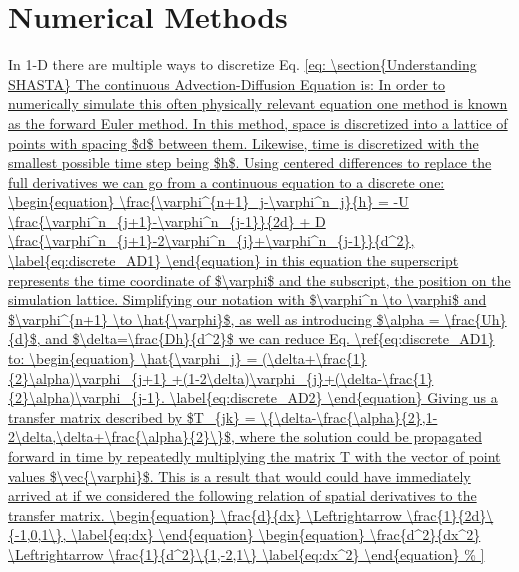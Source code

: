 \documentclass[]{article}
\begin{document}
\section{Numerical Methods}
In 1-D there are multiple ways to discretize Eq. \ref{eq:
\section{Understanding SHASTA}
The continuous Advection-Diffusion Equation is:



In order to numerically simulate this often physically relevant equation one method is known as the forward Euler method. In this method, space is discretized into a lattice of points with spacing $d$ between them. Likewise, time is discretized with the smallest possible time step being $h$. Using centered differences to replace the full derivatives we can go from a continuous equation to a discrete one:
\begin{equation}
\frac{\varphi^{n+1}_j-\varphi^n_j}{h} = -U \frac{\varphi^n_{j+1}-\varphi^n_{j-1}}{2d} + D \frac{\varphi^n_{j+1}-2\varphi^n_{j}+\varphi^n_{j-1}}{d^2},
\label{eq:discrete_AD1}
\end{equation}
in this equation the superscript represents the time coordinate of $\varphi$ and the subscript, the position on the simulation lattice. Simplifying our notation with $\varphi^n \to \varphi$ and $\varphi^{n+1} \to \hat{\varphi}$, as well as introducing $\alpha = \frac{Uh}{d}$, and $\delta=\frac{Dh}{d^2}$  we can reduce Eq. \ref{eq:discrete_AD1} to:

\begin{equation}
	\hat{\varphi_j} = (\delta+\frac{1}{2}\alpha)\varphi_{j+1} +(1-2\delta)\varphi_{j}+(\delta-\frac{1}{2}\alpha)\varphi_{j-1}. 
	\label{eq:discrete_AD2}
\end{equation}
Giving us a transfer matrix described by $T_{jk} = \{\delta-\frac{\alpha}{2},1-2\delta,\delta+\frac{\alpha}{2}\}$, where the solution could be propagated forward in time by repeatedly multiplying the matrix T with the vector of point values $\vec{\varphi}$. 
This is a result that would could have immediately arrived at if we considered the following relation of spatial derivatives to the transfer matrix.
\begin{equation}
\frac{d}{dx} \Leftrightarrow \frac{1}{2d}\{-1,0,1\},
\label{eq:dx}
\end{equation}
\begin{equation}
\frac{d^2}{dx^2} \Leftrightarrow \frac{1}{d^2}\{1,-2,1\}
\label{eq:dx^2}
\end{equation}
%

}
\end{document}
